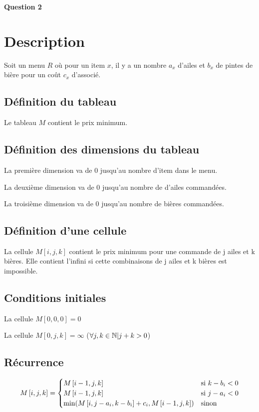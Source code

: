 \documentclass[class=article]{standalone}
\begin{document}
\centerline{\Huge \bf Question 2}
\bigskip

\section*{Description}

Soit un menu $R$ où pour un item $x$, il y a un nombre $a_x$ d'ailes 
et $b_x$ de pintes de bière pour un coût $c_x$ d'associé.

\subsection*{Définition du tableau}

Le tableau $M$ contient le prix minimum.

\subsection*{Définition des dimensions du tableau}

La première dimension va de 0 jusqu'au nombre d'item dans le menu.

La deuxième dimension va de 0 jusqu'au nombre de d'ailes commandées.

La troisième dimension va de 0 jusqu'au nombre de bières commandées.

\subsection*{Définition d'une cellule}

La cellule $M[i,j,k]$ contient le prix minimum pour une commande de j ailes et k bières.
Elle contient l'infini si cette combinaisons de j ailes et k bières est impossible.


\subsection*{Conditions initiales}

La cellule $M[0, 0, 0] = 0$

La cellule $M[0, j, k] = \infty$ ($\forall j, k \in \mathbb{N} | j + k > 0$)

\subsection*{Récurrence}

\[
    M\left [ i, j, k \right ] =
    \begin{cases}
        M\left [ i-1, j, k \right ] & \text{si } k-b_i < 0 \\
        M\left [ i-1, j, k \right ] & \text{si } j-a_i < 0 \\
        \min(M\left [ i, j-a_i, k-b_i \right ] + c_i, M\left [ i-1, j, k \right ]) & \text{sinon }
    \end{cases}
\]
\end{document}
